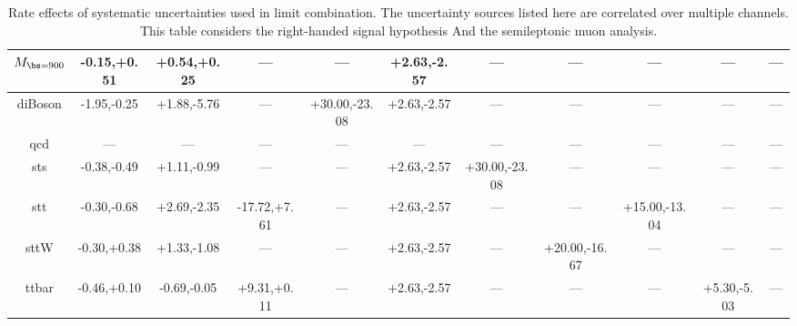 \begin{table}
\begin{center}
\begin{small}
{\begin{tabular}{|c||cccccccccc|}
\hline 
$M_{\bs=900}$ & -0.15,+0.51 & +0.54,+0.25 & --- & --- & +2.63,-2.57 & --- & --- & --- & --- & ---\\ 
\hline 
diBoson & -1.95,-0.25 & +1.88,-5.76 & --- & +30.00,-23.08 & +2.63,-2.57 & --- & --- & --- & --- & ---\\ 
\hline 
qcd & --- & --- & --- & --- & --- & --- & --- & --- & --- & ---\\ 
\hline 
sts & -0.38,-0.49 & +1.11,-0.99 & --- & --- & +2.63,-2.57 & +30.00,-23.08 & --- & --- & --- & ---\\ 
\hline 
stt & -0.30,-0.68 & +2.69,-2.35 & -17.72,+7.61 & --- & +2.63,-2.57 & --- & --- & +15.00,-13.04 & --- & ---\\ 
\hline 
sttW & -0.30,+0.38 & +1.33,-1.08 & --- & --- & +2.63,-2.57 & --- & +20.00,-16.67 & --- & --- & ---\\ 
\hline 
ttbar & -0.46,+0.10 & -0.69,-0.05 & +9.31,+0.11 & --- & +2.63,-2.57 & --- & --- & --- & +5.30,-5.03 & ---\\
\hline

\end{tabular}
}
\caption{Rate effects of systematic uncertainties used in limit combination.  The uncertainty sources listed here are correlated over multiple channels.  This table considers the right-handed signal hypothesis
And the semileptonic muon analysis.}
\label{table:bsRsysCoSm}

\end{small}
\end{center}
\end{table}




